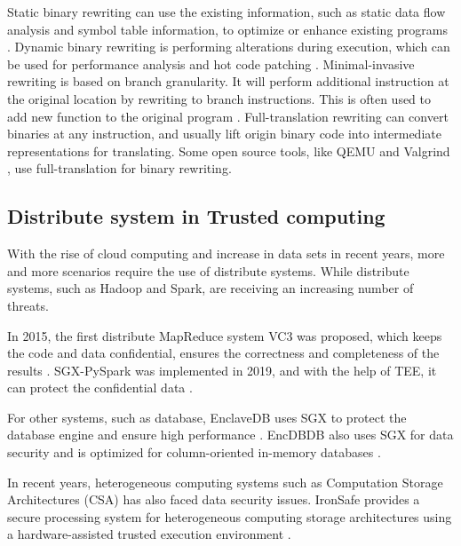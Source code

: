 Static binary rewriting can use the existing information, such as static data flow analysis and
symbol table information, to optimize or enhance existing programs \cite{10.1145/2629335, Schwarz2007PLTOAL}. 
Dynamic binary rewriting is performing alterations during execution, which can be used for performance
analysis \cite{Luk2005PinBC} and hot code patching \cite{Bruening2003AnIF}.
Minimal-invasive rewriting is based on branch granularity. It will perform additional instruction
at the original location by rewriting to branch instructions. This is often used to add new
function to the original program \cite{Federico2017revngAU}.
Full-translation rewriting can convert binaries at any instruction, and usually lift origin binary code
into intermediate representations for translating. Some open source tools,
like QEMU \cite{Bellard2005QEMUAF} and Valgrind \cite{Nethercote2007ValgrindAF},
use full-translation for binary rewriting.


\subsection{Distribute system in Trusted computing}
With the rise of cloud computing and increase in data sets in recent years,
more and more scenarios require the use of distribute systems.
While distribute systems, such as Hadoop and Spark, are receiving an increasing number of threats.

In 2015, the first distribute MapReduce system VC3 was proposed, which keeps the code and
data confidential, ensures the correctness and completeness of the results \cite{Schuster2015VC3TD}.
SGX-PySpark was implemented in 2019, and with the help of TEE, it can protect the confidential
data \cite{Quoc2019SGXPySparkSD}.

For other systems, such as database, EnclaveDB uses SGX to protect the database engine and ensure high performance \cite{Priebe2018EnclaveDBAS}. EncDBDB also uses SGX for data security and is optimized for column-oriented in-memory databases \cite{Fuhry2021EncDBDBSE}.

In recent years, heterogeneous computing systems such as Computation Storage Architectures (CSA) 
has also faced data security issues.
IronSafe provides a secure processing system for heterogeneous computing storage architectures using a hardware-assisted trusted execution environment \cite{Unnibhavi2022SecureAP}.
